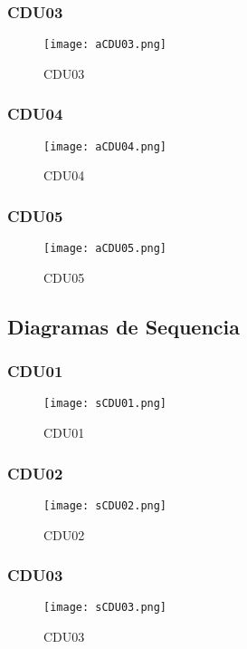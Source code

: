 \begin{landscape}
\subsubsection{CDU03}
\begin{figure}[htb]
	\centering
	\texttt{[image: aCDU03.png]}
	\caption{CDU03}
\end{figure}
\clearpage
%
\subsubsection{CDU04}
\begin{figure}[htb]
	\centering
	\texttt{[image: aCDU04.png]}
	\caption{CDU04}
\end{figure}
\clearpage
%
\subsubsection{CDU05}
\begin{figure}[htb]
	\centering
	\texttt{[image: aCDU05.png]}
	\caption{CDU05}
\end{figure}
\clearpage

\subsection{Diagramas de Sequencia}
\subsubsection{CDU01}
\begin{figure}[htb]
	\centering
	\texttt{[image: sCDU01.png]}
	\caption{CDU01}
\end{figure}
\clearpage
%
\subsubsection{CDU02}
\begin{figure}[htb]
	\centering
	\texttt{[image: sCDU02.png]}
	\caption{CDU02}
\end{figure}
\clearpage
%
\subsubsection{CDU03}
\begin{figure}[htb]
	\centering
	\texttt{[image: sCDU03.png]}
	\caption{CDU03}
\end{figure}
\clearpage
%

\end{landscape}
